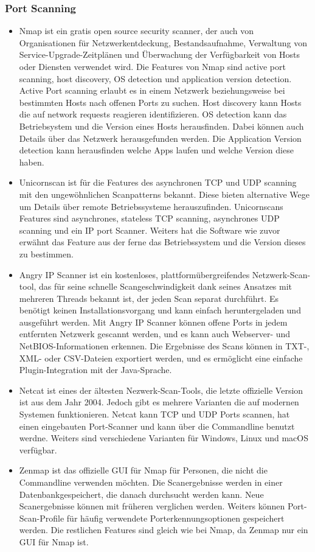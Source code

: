 \subsubsection{Port Scanning}

\begin{itemize}
	\item Nmap ist ein gratis open source security scanner, der auch von Organisationen für Netzwerkentdeckung, Bestandsaufnahme, Verwaltung von Service-Upgrade-Zeitplänen und Überwachung der Verfügbarkeit von Hosts oder Diensten verwendet wird. Die Features von Nmap sind active port scanning, host discovery, OS detection und application version detection. Active Port scanning erlaubt es in einem Netzwerk beziehungsweise bei bestimmten Hosts nach offenen Ports zu suchen. Host discovery kann Hosts die auf network requests reagieren identifizieren. OS detection kann das Betriebsystem und die Version eines Hosts herausfinden. Dabei können auch Details über das Netzwerk herausgefunden werden. Die Application Version detection kann herausfinden welche Apps laufen und welche Version diese haben.
	\item Unicornscan ist für die Features des asynchronen TCP und UDP scanning mit den ungewöhnlichen Scanpatterns bekannt. Diese bieten alternative Wege um Details über remote Betriebssysteme herauszufinden. Unicornscans Features sind asynchrones, stateless TCP scanning, asynchrones UDP scanning und ein IP port Scanner. Weiters hat die Software wie zuvor erwähnt das Feature aus der ferne das Betriebssystem und die Version dieses zu bestimmen.
	\item Angry IP Scanner ist ein kostenloses, plattformübergreifendes Netzwerk-Scan-tool, das für seine schnelle Scangeschwindigkeit dank seines Ansatzes mit mehreren Threads bekannt ist, der jeden Scan separat durchführt. Es benötigt keinen Installationsvorgang und kann einfach heruntergeladen und ausgeführt werden. Mit Angry IP Scanner können offene Ports in jedem entfernten Netzwerk gescannt werden, und es kann auch Webserver- und NetBIOS-Informationen erkennen. Die Ergebnisse des Scans können in TXT-, XML- oder CSV-Dateien exportiert werden, und es ermöglicht eine einfache Plugin-Integration mit der Java-Sprache.
	\item Netcat ist eines der ältesten Nezwerk-Scan-Tools, die letzte offizielle Version ist aus dem Jahr 2004. Jedoch gibt es mehrere Varianten die auf modernen Systemen funktionieren. Netcat kann TCP und UDP Ports scannen, hat einen eingebauten Port-Scanner und kann über die Commandline benutzt werdne. Weiters sind verschiedene Varianten für Windows, Linux und macOS verfügbar.
	\item Zenmap ist das offizielle GUI für Nmap für Personen, die nicht die Commandline verwenden möchten. Die Scanergebnisse werden in einer Datenbankgespeichert, die danach durchsucht werden kann. Neue Scanergebnisse können mit früheren verglichen werden. Weiters können Port-Scan-Profile für häufig verwendete Porterkennungsoptionen gespeichert werden. Die restlichen Features sind gleich wie bei Nmap, da Zenmap nur ein GUI für Nmap ist.
\end{itemize}

